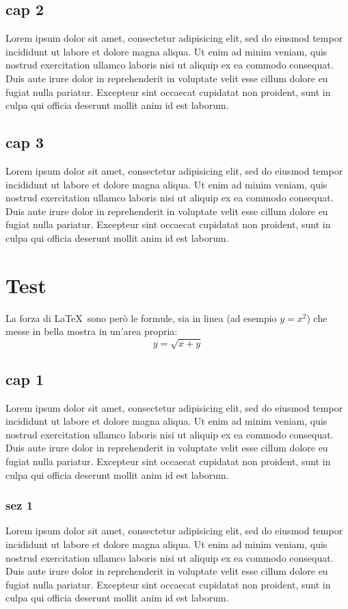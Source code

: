 \documentclass[a4paper,10pt]{report} %
\begin{document}
  \section{cap 2}
    Lorem ipsum dolor sit amet, consectetur adipisicing elit, sed do eiusmod tempor incididunt ut labore et dolore magna aliqua. Ut enim ad minim veniam, quis nostrud exercitation ullamco laboris nisi ut aliquip ex ea commodo consequat. Duis aute irure dolor in reprehenderit in voluptate velit esse cillum dolore eu fugiat nulla pariatur. Excepteur sint occaecat cupidatat non proident, sunt in culpa qui officia deserunt mollit anim id est laborum.
  \section{cap 3}
    Lorem ipsum dolor sit amet, consectetur adipisicing elit, sed do eiusmod tempor incididunt ut labore et dolore magna aliqua. Ut enim ad minim veniam, quis nostrud exercitation ullamco laboris nisi ut aliquip ex ea commodo consequat. Duis aute irure dolor in reprehenderit in voluptate velit esse cillum dolore eu fugiat nulla pariatur. Excepteur sint occaecat cupidatat non proident, sunt in culpa qui officia deserunt mollit anim id est laborum.
\newpage
\chapter{Test} %
  La forza di \LaTeX\ sono però le formule, sia in linea (ad esempio \(y=x^2\))
   che messe in bella mostra in un'area propria:
  \[y=\sqrt{x+y}\]
  \section{cap 1}
    Lorem ipsum dolor sit amet, consectetur adipisicing elit, sed do eiusmod tempor incididunt ut labore et dolore magna aliqua. Ut enim ad minim veniam, quis nostrud exercitation ullamco laboris nisi ut aliquip ex ea commodo consequat. Duis aute irure dolor in reprehenderit in voluptate velit esse cillum dolore eu fugiat nulla pariatur. Excepteur sint occaecat cupidatat non proident, sunt in culpa qui officia deserunt mollit anim id est laborum.
    \subsection{sez 1}
      Lorem ipsum dolor sit amet, consectetur adipisicing elit, sed do eiusmod tempor incididunt ut labore et dolore magna aliqua. Ut enim ad minim veniam, quis nostrud exercitation ullamco laboris nisi ut aliquip ex ea commodo consequat. Duis aute irure dolor in reprehenderit in voluptate velit esse cillum dolore eu fugiat nulla pariatur. Excepteur sint occaecat cupidatat non proident, sunt in culpa qui officia deserunt mollit anim id est laborum.
\end{document}
